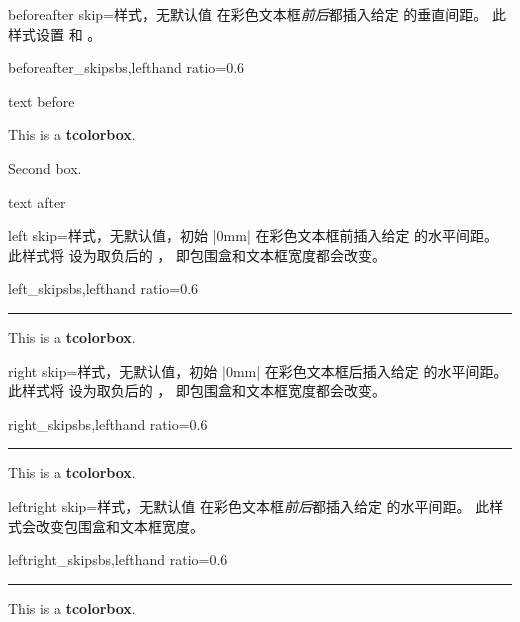 \begin{docTcbKey}[][doc new=2014-10-10]{beforeafter skip}{=}{样式，无默认值}
  在彩色文本框\emph{前后}都插入给定  的垂直间距。
  此样式设置  和 。
\begin{exdispExample*}{beforeafter_skip}{sbs,lefthand ratio=0.6}

text before
\begin{tcolorbox}
  This is a \textbf{tcolorbox}.
\end{tcolorbox}
\begin{tcolorbox}
  Second box.
\end{tcolorbox}
text after
\end{exdispExample*}
\end{docTcbKey}


\clearpage

\begin{docTcbKey}[][doc new=2014-11-07]{left skip}{=}{样式，无默认值，初始 |0mm|}
  在彩色文本框前插入给定  的水平间距。
  此样式将  设为取负后的 ，
  即包围盒和文本框宽度都会改变。
\begin{exdispExample*}{left_skip}{sbs,lefthand ratio=0.6}
\noindent\rule{\linewidth}{2pt}

\begin{tcolorbox}[left skip=1cm,
    colframe=red!50!white]
  This is a \textbf{tcolorbox}.
\end{tcolorbox}
\end{exdispExample*}
\end{docTcbKey}

\begin{docTcbKey}[][doc new=2014-11-07]{right skip}{=}{样式，无默认值，初始 |0mm|}
  在彩色文本框后插入给定  的水平间距。
  此样式将  设为取负后的 ，
  即包围盒和文本框宽度都会改变。
\begin{exdispExample*}{right_skip}{sbs,lefthand ratio=0.6}
\noindent\rule{\linewidth}{2pt}

\begin{tcolorbox}[right skip=1cm,
    colframe=red!50!white]
  This is a \textbf{tcolorbox}.
\end{tcolorbox}
\end{exdispExample*}
\end{docTcbKey}

\begin{docTcbKey}[][doc new=2014-10-10]{leftright skip}{=}{样式，无默认值}
  在彩色文本框\emph{前后}都插入给定  的水平间距。
  此样式会改变包围盒和文本框宽度。
\begin{exdispExample*}{leftright_skip}{sbs,lefthand ratio=0.6}
\noindent\rule{\linewidth}{2pt}

\begin{tcolorbox}[leftright skip=1cm,
    colframe=red!50!white]
  This is a \textbf{tcolorbox}.
\end{tcolorbox}
\end{exdispExample*}
\end{docTcbKey}


